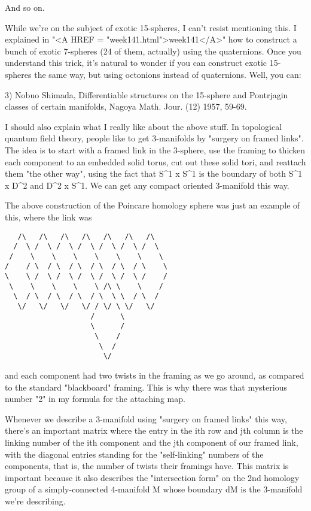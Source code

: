 And so on.  

While we're on the subject of exotic 15-spheres, I can't resist
mentioning this.  I explained in "<A HREF =
"week141.html">week141</A>" how to construct a bunch of exotic
7-spheres (24 of them, actually) using the quaternions.  Once you
understand this trick, it's natural to wonder if you can construct
exotic 15-spheres the same way, but using octonions instead of
quaternions.  Well, you can:

3) Nobuo Shimada, Differentiable structures on the 15-sphere and 
Pontrjagin classes of certain manifolds, Nagoya Math. Jour. (12) 1957, 59-69. 

I should also explain what I really like about the above stuff.  In
topological quantum field theory, people like to get 3-manifolds by
"surgery on framed links".  The idea is to start with a framed
link in the 3-sphere, use the framing to thicken each component to an
embedded solid torus, cut out these solid tori, and reattach them
"the other way", using the fact that S^{1} x
S^{1} is the boundary of both S^{1} x D^{2} and
D^{2} x S^{1}.  We can get any compact oriented
3-manifold this way.

The above construction of the Poincare homology sphere was just an
example of this, where the link was

\begin{verbatim}
   /\   /\   /\   /\   /\   /\   /\ 
  /  \ /  \ /  \ /  \ /  \ /  \ /  \
 /    \    \    \    \    \    \    \
/    / \  / \  / \  / \  / \  / \    \ 
\    \ /  \ /  \ /  \ /  \ /  \ /    / 
 \    \    \    \    \ /\ \    \    /
  \  / \  / \  / \  / \  \ \  / \  /
   \/   \/   \/   \/ / \/ \ \/   \/
                    /      \ 
                    \      /
                     \    /
                      \  /
                       \/ 
\end{verbatim}
    
and each component had two twists in the framing as we go around,
as compared to the standard "blackboard" framing.  This is why there 
was that mysterious number "2" in my formula for the attaching map.

Whenever we describe a 3-manifold using "surgery on framed
links" this way, there's an important matrix where the entry in the
ith row and jth column is the linking number of the ith component and
the jth component of our framed link, with the diagonal entries standing
for the "self-linking" numbers of the components, that is, the
number of twists their framings have.  This matrix is important because
it also describes the "intersection form" on the 2nd homology
group of a simply-connected 4-manifold M whose boundary dM is the
3-manifold we're describing.

